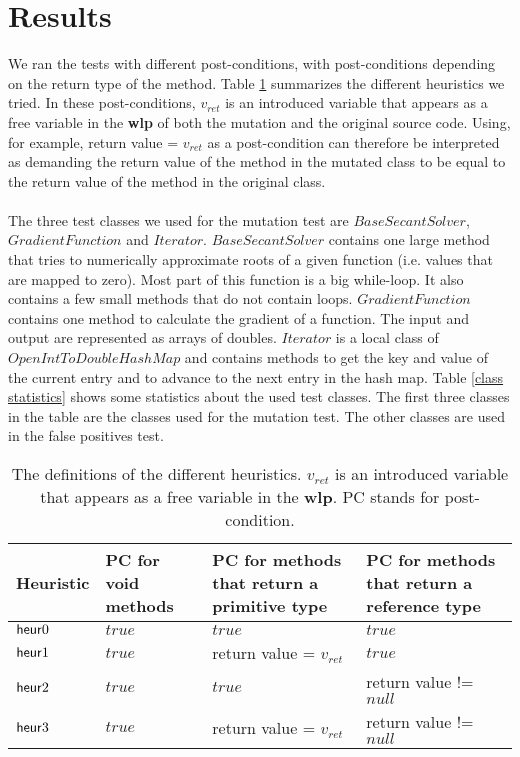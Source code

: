 \documentclass[a4paper, fleqn]{article}
\newcommand{\wlp}{\textbf{wlp}\xspace}
\begin{document}
\section{Results}
We ran the tests with different post-conditions, with post-conditions depending on the return type of the method. Table \ref{heuristics} summarizes the different heuristics we tried. In these post-conditions, $v_{ret}$ is an introduced variable that appears as a free variable in the \wlp of both the mutation and the original source code. Using, for example,  return value = $v_{ret}$ as a post-condition can therefore be interpreted as demanding the return value of the method in the mutated class to be equal to the return value of the method in the original class. 
\\\\
The three test classes we used for the mutation test are $BaseSecantSolver$, $GradientFunction$ and $Iterator$. $BaseSecantSolver$ contains one large method that tries to numerically approximate roots of a given function (i.e. values that are mapped to zero). Most part of this function is a big while-loop. It also contains a few small methods that do not contain loops. $GradientFunction$ contains one method to calculate the gradient of a function. The input and output are represented as arrays of doubles. $Iterator$ is a local class of $OpenIntToDoubleHashMap$ and contains methods to get the key and value of the current entry and to advance to the next entry in the hash map. Table \ref{class statistics} shows some statistics about the used test classes. The first three classes in the table are the classes used for the mutation test. The other classes are used in the false positives test.

\begin{table}
    \begin{tabular}{ | p{1.5cm} | p{1.8cm} | p{3.7cm} | p{3.7cm} |}
    \hline
    Heuristic & PC for void methods & PC for methods that return a primitive type & PC for methods that return a reference type \\ \hline
    ${\sf heur}0$ & $true$ & $true$ & $true$ \\ \hline
    ${\sf heur}1$ & $true$ & return value = $v_{ret}$  & $true$ \\ \hline
    ${\sf heur}2$ & $true$ & $true$ & return value != $null$  \\ \hline
    ${\sf heur}3$ & $true$ & return value = $v_{ret}$ & return value != $null$  \\ \hline
    \end{tabular}
\caption{The definitions of the different heuristics. $v_{ret}$ is an introduced variable that appears as a free variable in the \wlp. PC stands for post-condition.}
\label{heuristics}
\end{table}
\end{document}
